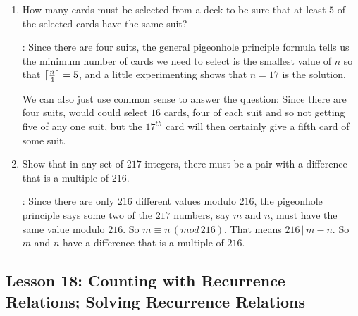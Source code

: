 \documentclass[11pt]{amsart}
\begin{document}
\begin{enumerate}
\item How many cards must be selected from a deck to be sure that at least
$5$ of the selected cards have the same suit?

: Since there are four suits, the general pigeonhole principle 
formula tells us the minimum number of cards we need to select is the smallest 
value of $n$ so that 
$\lceil{n\over 4}\rceil = 5$, and a little experimenting shows that $n=17$ is the
solution.

We can also just use common sense to answer the question: Since there are four suits,
would could select $16$ cards, four of each suit and so not getting five of any one
suit, but the $17^{th}$ card will then certainly give a fifth card of some suit. 

\medskip

\item Show that in any set of $217$ integers, there must be a pair
with a difference that is a multiple of $216$.

:  Since
there are only $216$ different values modulo $216$, the pigeonhole principle says
some two of the $217$ numbers, say $m$ and $n$, must have the same value modulo 
$216$. So $m\equiv n\,(mod\,216)$. That means $216\,|\,m-n$. So $m$ and $n$ have 
a difference that is a multiple of $216$.

\end{enumerate}

\subsection{Lesson 18: Counting with Recurrence Relations; Solving Recurrence Relations}
\end{document}
